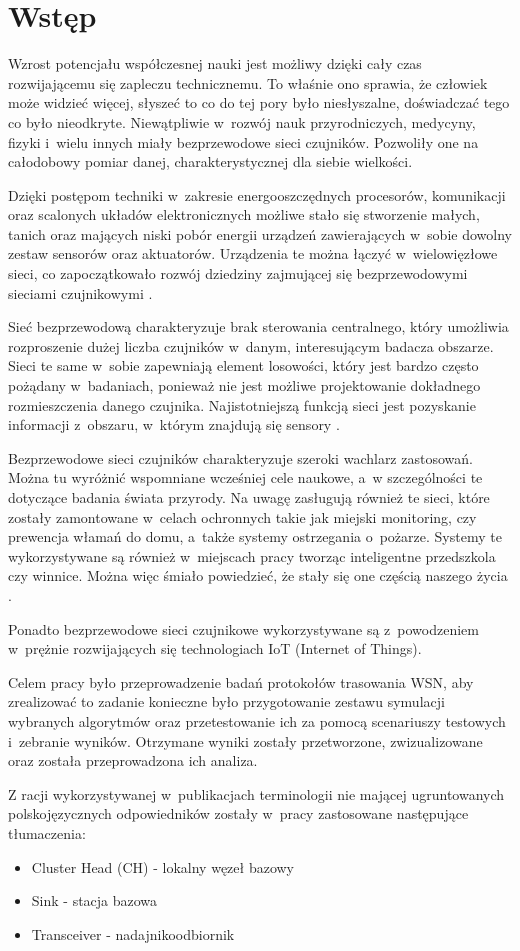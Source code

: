 \chapter{Wstęp}
Wzrost potencjału współczesnej nauki jest możliwy dzięki cały czas rozwijającemu się zapleczu technicznemu. To właśnie ono sprawia, że człowiek może widzieć więcej, słyszeć to co do tej pory było niesłyszalne, doświadczać tego co było nieodkryte. Niewątpliwie w~rozwój nauk przyrodniczych, medycyny, fizyki i~wielu innych miały bezprzewodowe sieci czujników. Pozwoliły one na całodobowy pomiar danej, charakterystycznej dla siebie wielkości.

Dzięki postępom techniki w~zakresie energooszczędnych procesorów, komunikacji oraz scalonych układów elektronicznych możliwe stało się stworzenie małych, tanich oraz mających niski pobór energii urządzeń zawierających w~sobie dowolny zestaw sensorów oraz aktuatorów. Urządzenia te można łączyć w~wielowięzłowe sieci, co zapoczątkowało rozwój dziedziny zajmującej się bezprzewodowymi sieciami czujnikowymi \cite{FahmyIntro2016}. 

Sieć bezprzewodową charakteryzuje brak sterowania centralnego, który umożliwia rozproszenie dużej liczba czujników w~danym, interesującym badacza obszarze. Sieci te same w~sobie zapewniają element losowości, który jest bardzo często pożądany w~badaniach, ponieważ nie jest możliwe projektowanie dokładnego rozmieszczenia danego czujnika. Najistotniejszą funkcją sieci jest pozyskanie informacji z~obszaru, w~którym znajdują się sensory \cite{Akyildiz2010}.

Bezprzewodowe sieci czujników charakteryzuje szeroki wachlarz zastosowań. Można tu wyróżnić wspomniane wcześniej cele naukowe, a~w szczególności te dotyczące badania świata przyrody. Na uwagę zasługują również te sieci, które zostały zamontowane w~celach ochronnych takie jak miejski monitoring, czy prewencja włamań do domu, a~także systemy ostrzegania o~pożarze. Systemy te wykorzystywane są również w~miejscach pracy tworząc inteligentne przedszkola czy winnice. Można więc śmiało powiedzieć, że
stały się one częścią naszego życia \cite{Ilyas2004}.

Ponadto bezprzewodowe sieci czujnikowe wykorzystywane są z~powodzeniem w~prężnie rozwijających się technologiach IoT (Internet of Things). 

Celem pracy było przeprowadzenie badań protokołów trasowania WSN, aby zrealizować to zadanie konieczne było przygotowanie zestawu symulacji wybranych algorytmów oraz przetestowanie ich za pomocą scenariuszy testowych i~zebranie wyników. Otrzymane wyniki zostały przetworzone, zwizualizowane oraz została przeprowadzona ich analiza.

Z racji wykorzystywanej w~publikacjach terminologii nie mającej ugruntowanych polskojęzycznych odpowiedników zostały w~pracy zastosowane następujące tłumaczenia:
\begin{itemize}
\item Cluster Head (CH) - lokalny węzeł bazowy
\item Sink - stacja bazowa
\item Transceiver - nadajnikoodbiornik
\end{itemize}